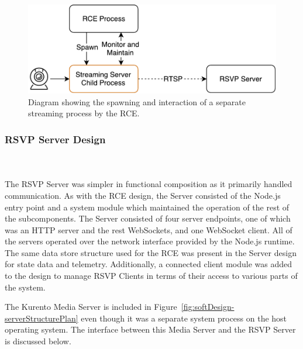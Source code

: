            \begin{figure}[h!]
             \centering
             \includegraphics[width=0.6\linewidth]{figures/softDesign-commStreamingDesign}
             \caption[Diagram showing the spawning and interaction of a separate streaming process by the RCE.]{Diagram showing the spawning and interaction of a separate streaming process by the RCE.}
             \label{fig:softDesign-commStreamingDesign}
           \end{figure}

    \subsubsection{RSVP Server Design}
    \label{subsubsec:rsvpServersPlan}
      \\\\
        The RSVP Server was simpler in functional composition as it primarily handled communication. As with the RCE design, the Server consisted of the Node.js entry point and a system module which maintained the operation of the rest of the subcomponents. The Server consisted of four server endpoints, one of which was an HTTP server and the rest WebSockets, and one WebSocket client. All of the servers operated over the network interface provided by the Node.js runtime. The same data store structure used for the RCE was present in the Server design for state data and telemetry. Additionally, a connected client module was added to the design to manage RSVP Clients in terms of their access to various parts of the system.
        
        The Kurento Media Server is included in Figure~\ref{fig:softDesign-serverStructurePlan} even though it was a separate system process on the host operating system. The interface between this Media Server and the RSVP Server is discussed below.
      

